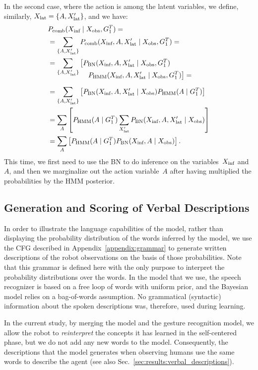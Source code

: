 In the second case, where the action is among the latent variables, we define, similarly, $X_\text{lat} = \{A, X_\text{lat}^\prime\}$, and we have:
\begin{align} \label{eq:fusion_including_action}
  & \pcomb(\xinf \given \xobs, G_1^T) = \nonumber \\
  &= \sum_{\{A,\xlat^\prime\}} \pcomb(\xinf, A, \xlat^\prime \given \xobs, G_1^T)= \nonumber \\
  &= \sum_{\{A,\xlat^\prime\}} \left[\pbn(\xinf, A, \xlat^\prime \given \xobs, G_1^T)\right. \nonumber \\[-4mm]
    & \mspace{100mu} \left.\phmm(\xinf, A, \xlat^\prime \given \xobs, G_1^T)\right]= \nonumber \\[2mm]
  &= \sum_{\{A,\xlat^\prime\}} \left[\pbn(\xinf, A, \xlat^\prime \given \xobs) \phmm(A \given G_1^T)\right] \nonumber \\
  &= \sum_{A}\left[\phmm(A \given G_1^T)\sum_{\xlat^\prime} \pbn(\xinf, A, \xlat^\prime \given \xobs)\right] \nonumber \\
  &= \sum_{A}\left[\phmm(A \given G_1^T) \pbn(\xinf, A \given \xobs)\right].
\end{align}
This time, we first need to use the \ac{BN} to do inference on the variables~$X_\text{inf}$ and~$A$, and then we marginalize out the action variable~$A$ after having multiplied the probabilities by the \ac{HMM} posterior.

\subsection{Generation and Scoring of Verbal Descriptions}
\label{sec:method:verbal}

In order to illustrate the language capabilities of the model, rather than displaying the probability distribution of the words inferred by the model, we use the \ac{CFG} described in Appendix~\ref{appendix:grammar} to generate written descriptions of the robot observations on the basis of those probabilities.
Note that this grammar is defined here with the only purpose to interpret the probability distributions over the words.
In the \AffWords{} model that we use, the speech recognizer is based on a free loop of words with uniform prior, and the Bayesian model relies on a bag-of-words assumption.
No grammatical (syntactic) information about the spoken descriptions was, therefore, used during learning.

In the current study, by merging the \AffWords{} model and the gesture recognition model, we allow the robot to \emph{reinterpret} the concepts it has learned in the self-centered phase, but we do not add any new words to the model.
Consequently, the descriptions that the model generates when observing humans use the same words to describe the agent (see also Sec.~\ref{sec:results:verbal_descriptions}).

